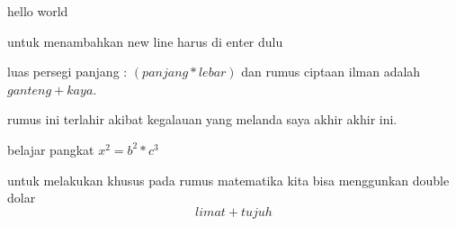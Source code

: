 \documentclass[12pt]{article}
\begin{document}
	hello world

	untuk menambahkan new line harus di enter dulu 
	
	luas persegi panjang : $(panjang * lebar)$ dan rumus ciptaan ilman adalah $ganteng + kaya$.


	rumus ini terlahir akibat kegalauan yang melanda saya akhir akhir ini.
	
	belajar pangkat $x^2 = b^2 * c^3$
	
	untuk melakukan khusus pada rumus matematika kita bisa menggunkan double dolar $$ limat + tujuh $$
\end{document}
